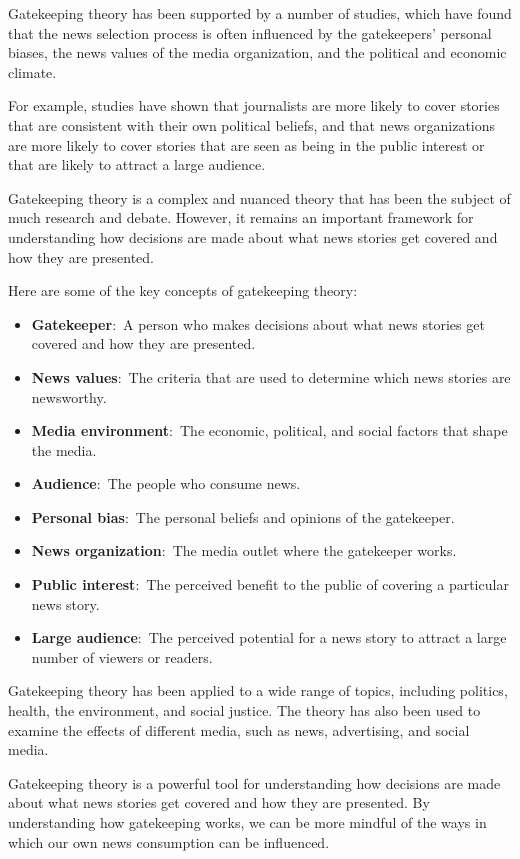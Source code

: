 \documentclass[
  b5paper]{book}
\begin{document}
Gatekeeping theory has been supported by a number of studies, which have found that the news selection process is often influenced by the gatekeepers' personal biases, the news values of the media organization, and the political and economic climate.

For example, studies have shown that journalists are more likely to cover stories that are consistent with their own political beliefs, and that news organizations are more likely to cover stories that are seen as being in the public interest or that are likely to attract a large audience.

Gatekeeping theory is a complex and nuanced theory that has been the subject of much research and debate. However, it remains an important framework for understanding how decisions are made about what news stories get covered and how they are presented.

Here are some of the key concepts of gatekeeping theory:

\begin{itemize}
\item
  \textbf{Gatekeeper}:~A person who makes decisions about what news stories get covered and how they are presented.
\item
  \textbf{News values}:~The criteria that are used to determine which news stories are newsworthy.
\item
  \textbf{Media environment}:~The economic, political, and social factors that shape the media.
\item
  \textbf{Audience}:~The people who consume news.
\item
  \textbf{Personal bias}:~The personal beliefs and opinions of the gatekeeper.
\item
  \textbf{News organization}:~The media outlet where the gatekeeper works.
\item
  \textbf{Public interest}:~The perceived benefit to the public of covering a particular news story.
\item
  \textbf{Large audience}:~The perceived potential for a news story to attract a large number of viewers or readers.
\end{itemize}

Gatekeeping theory has been applied to a wide range of topics, including politics, health, the environment, and social justice. The theory has also been used to examine the effects of different media, such as news, advertising, and social media.

Gatekeeping theory is a powerful tool for understanding how decisions are made about what news stories get covered and how they are presented. By understanding how gatekeeping works, we can be more mindful of the ways in which our own news consumption can be influenced.
\end{document}
